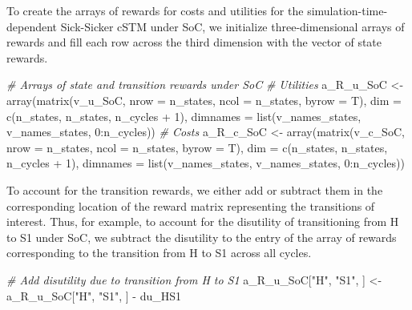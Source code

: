 \documentclass[
]{article}
\newenvironment{Shaded}{\begin{snugshade}}{\end{snugshade}}
\newcommand{\AttributeTok}[1]{\textcolor[rgb]{0.77,0.63,0.00}{#1}}
\newcommand{\CommentTok}[1]{\textcolor[rgb]{0.56,0.35,0.01}{\textit{#1}}}
\newcommand{\DecValTok}[1]{\textcolor[rgb]{0.00,0.00,0.81}{#1}}
\newcommand{\FunctionTok}[1]{\textcolor[rgb]{0.00,0.00,0.00}{#1}}
\newcommand{\NormalTok}[1]{#1}
\newcommand{\OtherTok}[1]{\textcolor[rgb]{0.56,0.35,0.01}{#1}}
\newcommand{\SpecialCharTok}[1]{\textcolor[rgb]{0.00,0.00,0.00}{#1}}
\newcommand{\StringTok}[1]{\textcolor[rgb]{0.31,0.60,0.02}{#1}}
\begin{document}
To create the arrays of rewards for costs and utilities for the simulation-time-dependent Sick-Sicker cSTM under SoC, we initialize three-dimensional arrays of rewards and fill each row across the third dimension with the vector of state rewards.

\begin{Shaded}
\begin{Highlighting}[]
\CommentTok{\# Arrays of state and transition rewards under SoC}
\CommentTok{\# Utilities}
\NormalTok{a\_R\_u\_SoC }\OtherTok{\textless{}{-}} \FunctionTok{array}\NormalTok{(}\FunctionTok{matrix}\NormalTok{(v\_u\_SoC, }\AttributeTok{nrow =}\NormalTok{ n\_states, }\AttributeTok{ncol =}\NormalTok{ n\_states, }\AttributeTok{byrow =}\NormalTok{ T), }
                  \AttributeTok{dim =} \FunctionTok{c}\NormalTok{(n\_states, n\_states, n\_cycles }\SpecialCharTok{+} \DecValTok{1}\NormalTok{),}
                  \AttributeTok{dimnames =} \FunctionTok{list}\NormalTok{(v\_names\_states, v\_names\_states, }\DecValTok{0}\SpecialCharTok{:}\NormalTok{n\_cycles))}
\CommentTok{\# Costs}
\NormalTok{a\_R\_c\_SoC }\OtherTok{\textless{}{-}} \FunctionTok{array}\NormalTok{(}\FunctionTok{matrix}\NormalTok{(v\_c\_SoC, }\AttributeTok{nrow =}\NormalTok{ n\_states, }\AttributeTok{ncol =}\NormalTok{ n\_states, }\AttributeTok{byrow =}\NormalTok{ T), }
                  \AttributeTok{dim =} \FunctionTok{c}\NormalTok{(n\_states, n\_states, n\_cycles }\SpecialCharTok{+} \DecValTok{1}\NormalTok{),}
                  \AttributeTok{dimnames =} \FunctionTok{list}\NormalTok{(v\_names\_states, v\_names\_states, }\DecValTok{0}\SpecialCharTok{:}\NormalTok{n\_cycles))}
\end{Highlighting}
\end{Shaded}

To account for the transition rewards, we either add or subtract them in the corresponding location of the reward matrix representing the transitions of interest. Thus, for example, to account for the disutility of transitioning from H to S1 under SoC, we subtract the disutility to the entry of the array of rewards corresponding to the transition from H to S1 across all cycles.

\begin{Shaded}
\begin{Highlighting}[]
\CommentTok{\# Add disutility due to transition from H to S1}
\NormalTok{a\_R\_u\_SoC[}\StringTok{"H"}\NormalTok{, }\StringTok{"S1"}\NormalTok{, ] }\OtherTok{\textless{}{-}}\NormalTok{ a\_R\_u\_SoC[}\StringTok{"H"}\NormalTok{, }\StringTok{"S1"}\NormalTok{, ] }\SpecialCharTok{{-}}\NormalTok{ du\_HS1}
\end{Highlighting}
\end{Shaded}
\end{document}
